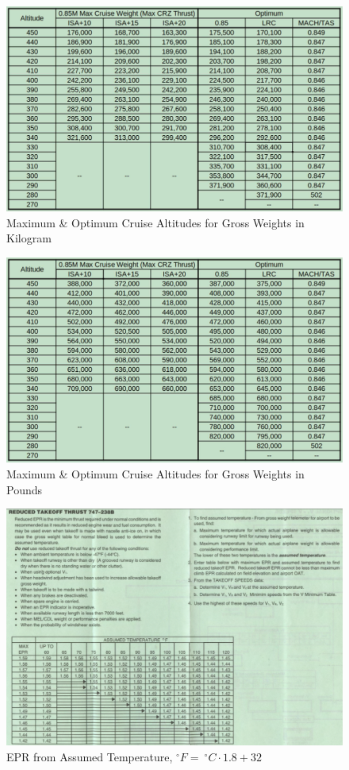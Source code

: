 \documentclass[sim-use, blue_items]{checklist}
\begin{document}
\begin{figure}[ht]
    \centering
	\includegraphics[width=\linewidth]{addenda/maxaltitude_kg_felis.png}
    \caption{Maximum \& Optimum Cruise Altitudes for Gross Weights in Kilogram}
\end{figure}

\begin{figure}[ht]
    \centering
	\includegraphics[width=\linewidth]{addenda/maxaltitude_lb_felis.png}
    \caption{Maximum \& Optimum Cruise Altitudes for Gross Weights in Pounds}
\end{figure}

\begin{figure}[ht]
    \centering
	\includegraphics[width=\linewidth]{addenda/assumed_temp_742.png}
    \caption{EPR from Assumed Temperature, $^\circ F =\ ^\circ C \cdot 1.8 + 32$}
\end{figure}
\end{document}
